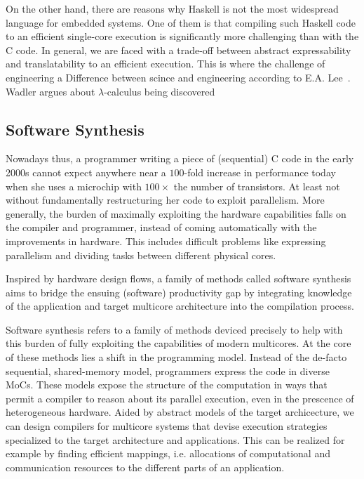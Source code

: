 On the other hand, there are reasons why Haskell is not the most widespread language for embedded systems.
One of them is that compiling such Haskell code to an efficient single-core execution is significantly more challenging than with the C code.
In general, we are faced with a trade-off between abstract expressability and translatability to an efficient execution.
This is where the challenge of engineering a 
Difference between scince and engineering according to E.A. Lee~\cite{lee2017plato}.
Wadler argues about $\lambda$-calculus being discovered~\cite{wadler2015propositions}


\subsection{Software Synthesis}

Nowadays thus, a programmer writing a piece of (sequential) C code in the early 2000s cannot expect anywhere near a $100$-fold increase in performance today when she uses a microchip with $100 \times$ the number of transistors.
At least not without fundamentally restructuring her code to exploit parallelism.
More generally, the burden of maximally exploiting the hardware capabilities falls on the compiler and programmer, instead of coming automatically with the improvements in hardware.
This includes difficult problems like expressing parallelism and dividing tasks between different physical cores. %

Inspired by hardware design flows, a family of methods called software synthesis aims to bridge the ensuing (software) productivity gap by integrating knowledge of the application and target multicore architecture into the compilation process.


Software synthesis refers to a family of methods deviced precisely to help with this burden of fully exploiting the capabilities of modern multicores.
At the core of these methods lies a shift in the programming model.
Instead of the de-facto sequential, shared-memory model, programmers express the code in diverse \acp{MoC}.
These models expose the structure of the computation in ways that permit a compiler to reason about its parallel execution, even in the prescence of heterogeneous hardware.
Aided by abstract models of the target archicecture, we can design compilers for multicore systems that devise execution strategies specialized to the target architecture and applications.
This can be realized for example by finding efficient mappings, i.e. allocations of computational and communication resources to the different parts of an application.

